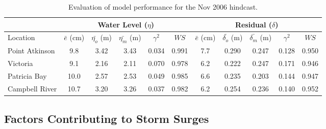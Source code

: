 \documentclass[pdftex,10pt]{article}
\begin{document}
\begin{table}[h]
\centering 
\begin{tabular}{|l |c c c c c | c c c c c|} 
\hline 
& \multicolumn{5}{|c|}{Water Level ($\eta$)}        & \multicolumn{5}{|c|}{Residual ($\delta$)} \\ 
\hline 
Location       & $\bar{e}$ (cm) & $\bar{\eta_{o}}$ (m) & $\bar{\eta_{m}}$ (m) & $\gamma^2$ & $WS$   & $\bar{e}$ (cm) & $\bar{\delta_{o}}$ (m) & $\bar{\delta_{m}}$ (m) & $\gamma^2$ & $WS$ \\
\hline 
Point Atkinson &  9.8           &  3.42                & 3.43                 &   0.034    & 0.991  &  7.7           &  0.290                 & 0.247                  &  0.128     & 0.950 \\
Victoria       &  9.1           &  2.16                & 2.11                 &   0.070    & 0.978  &  6.2           &  0.222                 & 0.247                  &  0.171     & 0.946 \\
Patricia Bay   & 10.0           &  2.57                & 2.53                 &   0.049    & 0.985  &  6.6           &  0.235                 & 0.203                  &  0.144     & 0.947 \\
Campbell River & 10.7           &  3.20                & 3.26                 &   0.037    & 0.982  &  6.2           &  0.254                 & 0.236                  &  0.140     & 0.952 \\
\hline 
\end{tabular}
\caption{Evaluation of model performance for the Nov 2006 hindcast.}
\label{tab:nov2006stat} 
\end{table}



\subsection{Factors Contributing to Storm Surges}
\end{document}

